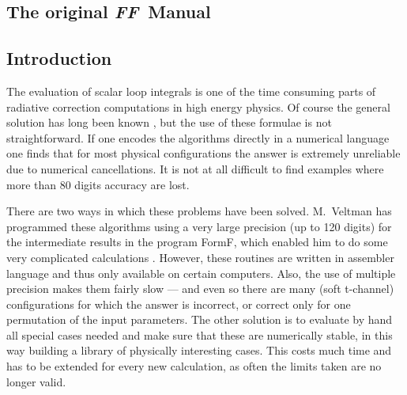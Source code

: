 \documentclass[twoside,12pt]{report}
\def\FF{\textit{FF}}
\begin{document}
\begin{appendix}

\chapter{The original \FF\ Manual}

\newcommand\comp{\tt}
\newcommand\ms{\,\mbox{ms}}


\section{Introduction}

The evaluation of scalar loop integrals is one of the time consuming parts
of radiative correction computations in high energy physics.  Of course the
general solution has long been known \cite{tHV79}, but the use of
these formulae is not straightforward.  If one encodes the algorithms
directly in a numerical language one finds that for most physical
configurations the answer is extremely unreliable due to numerical
cancellations.  It is not at all difficult to find examples where more
than 80 digits accuracy are lost.

There are two ways in which these problems have been solved.  M.~Veltman has 
programmed these algorithms using a very large precision (up to 120 digits) 
for the intermediate results in the program FormF\null, which enabled him to 
do some very complicated calculations \cite{PaV79}.  However, 
these routines are written in assembler language and thus only available on 
certain computers.  Also, the use of multiple precision makes them fairly slow 
--- and even so there are many (soft t-channel) configurations for which the 
answer is incorrect, or correct only for one permutation of the input 
parameters.  The other solution is to evaluate by hand all special cases 
needed and make sure that these are numerically stable, in this way building a 
library of physically interesting cases.  This costs much time and has to be 
extended for every new calculation, as often the limits taken are no longer 
valid.


\end{appendix}
\end{document}
